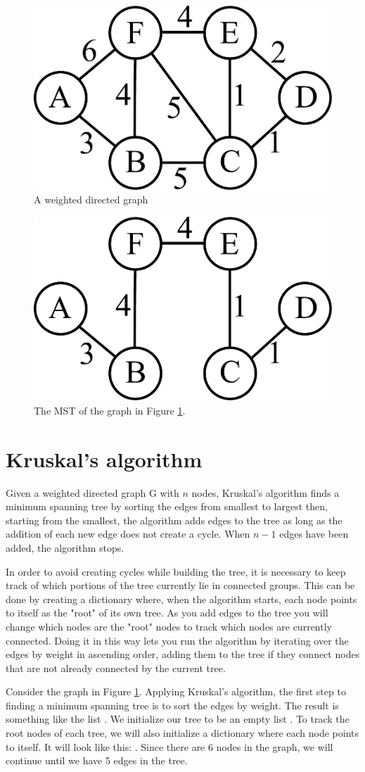 \begin{figure}[H]
\includegraphics[width = .4\textwidth]{graph4.pdf}
\caption{A weighted directed graph}
\label{mst:graph4}
\end{figure}

\begin{figure}[H]
\includegraphics[width = .4\textwidth]{graph5.pdf}
\caption{The MST of the graph in Figure \ref{mst:graph4}.}
\end{figure}

\section*{Kruskal's algorithm}

Given a weighted directed graph G with $n$ nodes, Kruskal's algorithm finds a minimum spanning tree by sorting the edges from smallest to largest then, starting from the smallest, the algorithm adds edges to the tree as long as the addition of each new edge does not create a cycle.
When $n-1$ edges have been added, the algorithm stops.

In order to avoid creating cycles while building the tree, it is necessary to keep track of which portions of the tree currently lie in connected groups.
This can be done by creating a dictionary where, when the algorithm starts, each node points to itself as the "root" of its own tree.
As you add edges to the tree you will change which nodes are the "root" nodes to track which nodes are currently connected.
Doing it in this way lets you run the algorithm by iterating over the edges by weight in ascending order, adding them to the tree if they connect nodes that are not already connected by the current tree.

Consider the graph in Figure \ref{mst:graph4}.
Applying Kruskal's algorithm, the first step to finding a minimum spanning tree is to sort the edges by weight.
The result is something like the list \li{[(C, D, 1), (C, E, 1), (D, E, 2), (A, B, 3), (B, F, 4), (E, F, 4), (B, C, 5), (C, F, 5), (A, F, 6)]}.
We initialize our tree to be an empty list \li{[]}.
To track the root nodes of each tree, we will also initialize a dictionary where each node points to itself.
It will look like this: .
Since there are 6 nodes in the graph, we will continue until we have 5 edges in the tree.

